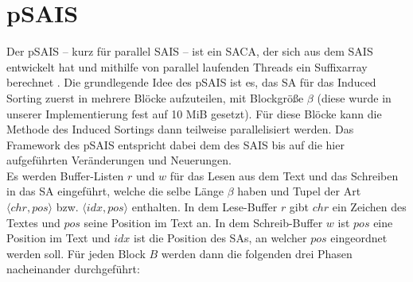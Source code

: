 \section{pSAIS}
\label{section:psais}


Der pSAIS -- kurz für parallel SAIS -- ist ein SACA, der sich aus dem SAIS entwickelt hat und mithilfe von parallel laufenden Threads ein Suffixarray berechnet \cite{psais}. Die grundlegende Idee des pSAIS ist es, das SA für das Induced Sorting zuerst in mehrere Blöcke aufzuteilen, mit Blockgröße $\beta$ (diese wurde in unserer Implementierung fest auf 10 MiB gesetzt). Für diese Blöcke kann die Methode des Induced Sortings dann teilweise parallelisiert werden. Das Framework des pSAIS entspricht dabei dem des SAIS bis auf die hier aufgeführten Veränderungen und Neuerungen. \\
Es werden Buffer-Listen $r$ und $w$ für das Lesen aus dem Text und das Schreiben in das SA  eingeführt, welche die selbe Länge $\beta$ haben und Tupel der Art $\langle chr, pos \rangle$ bzw. $\langle idx, pos \rangle$ enthalten. In dem Lese-Buffer $r$ gibt $chr$ ein Zeichen des Textes und $pos$ seine Position im Text an. In dem Schreib-Buffer $w$ ist $pos$ eine Position im Text und $idx$ ist die Position des SAs, an welcher $pos$ eingeordnet werden soll. Für jeden Block $B$ werden dann die folgenden drei Phasen nacheinander durchgeführt:

